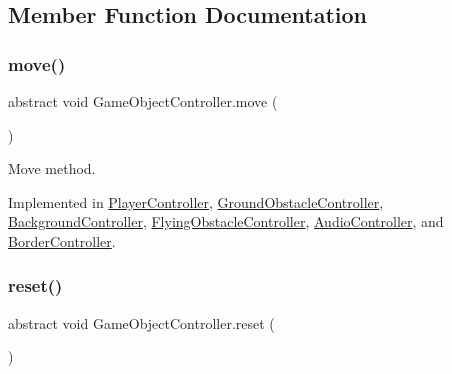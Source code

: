 \subsection{Member Function Documentation}
\hypertarget{class_game_object_controller_a0d186d143e280869efaff7835730fc82}{}\label{class_game_object_controller_a0d186d143e280869efaff7835730fc82} 
\subsubsection{\texorpdfstring{move()}{move()}}
{\footnotesize\ttfamily abstract void Game\+Object\+Controller.\+move (\begin{DoxyParamCaption}{ }\end{DoxyParamCaption})\hspace{0.3cm}{\ttfamily [pure virtual]}}



Move method. 



Implemented in \hyperlink{class_player_controller_ad29e0ec800244a64e7f2362196cdbf6c}{Player\+Controller}, \hyperlink{class_ground_obstacle_controller_aad450d16fef8b23f848f87a81d1790a8}{Ground\+Obstacle\+Controller}, \hyperlink{class_background_controller_ac4b0d540fa72d7c57e919c309bb8f167}{Background\+Controller}, \hyperlink{class_flying_obstacle_controller_afd00f43efeabf1068a6ddb7ece716700}{Flying\+Obstacle\+Controller}, \hyperlink{class_audio_controller_af4b01a95141dabb50d0bc39cc3abb4e6}{Audio\+Controller}, and \hyperlink{class_border_controller_ac466a3afffc866364d246b57041c81b2}{Border\+Controller}.

\hypertarget{class_game_object_controller_a5e57dfd66120a1400e5947f5664a41e4}{}\label{class_game_object_controller_a5e57dfd66120a1400e5947f5664a41e4} 
\subsubsection{\texorpdfstring{reset()}{reset()}}
{\footnotesize\ttfamily abstract void Game\+Object\+Controller.\+reset (\begin{DoxyParamCaption}{ }\end{DoxyParamCaption})\hspace{0.3cm}{\ttfamily [pure virtual]}}




